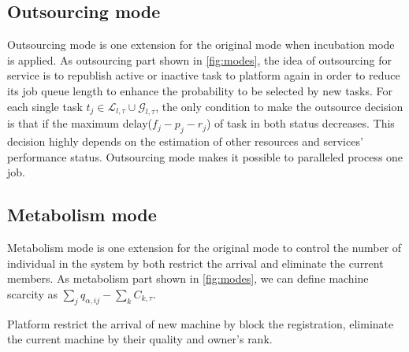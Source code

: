 



\subsection{Outsourcing mode} %
\label{sub:outsource_mode}
Outsourcing mode is one extension for the original mode when incubation mode is applied. As outsourcing part shown in \autoref{fig:modes},
the idea of outsourcing for service is to republish active or inactive task to platform again in order to reduce its job queue length to enhance the probability to be selected by new tasks. For each single task $t_j\in\mathcal{L}_{l,\tau}\cup\mathcal{G}_{l,\tau}$, the only condition to make the outsource decision is that if the maximum delay($f_j-p_j-r_j$) of task in both status decreases. This decision highly depends on the estimation of other resources and services' performance status. Outsourcing mode makes it possible to paralleled process one job.

\subsection{Metabolism mode} %
\label{sub:metabolism mode}
Metabolism mode is one extension for the original mode to control the number of individual in the system by both restrict the arrival and eliminate the current members. As metabolism part shown in \autoref{fig:modes},
we can define machine scarcity as $\sum_jq_{\alpha,ij} - \sum_kC_{k,\tau}$.

Platform restrict the arrival of new machine by block the registration, eliminate the current machine by their quality and owner's rank.


